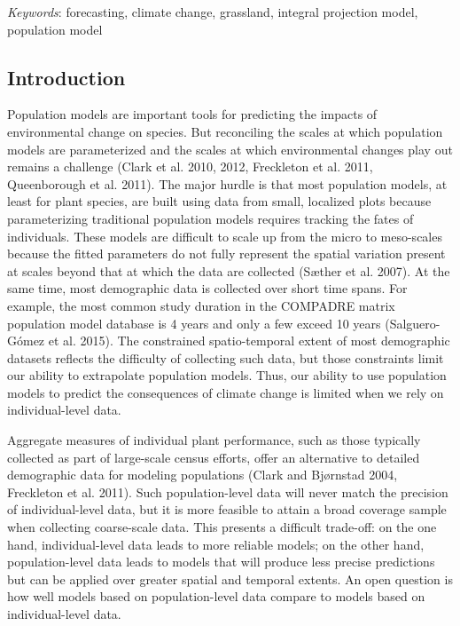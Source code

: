 \documentclass[12pt,]{article}
\begin{document}
\emph{Keywords}: forecasting, climate change, grassland, integral
projection model, population model

\subsection{Introduction}\label{introduction}

Population models are important tools for predicting the impacts of
environmental change on species. But reconciling the scales at which
population models are parameterized and the scales at which
environmental changes play out remains a challenge (Clark et al. 2010,
2012, Freckleton et al. 2011, Queenborough et al. 2011). The major
hurdle is that most population models, at least for plant species, are
built using data from small, localized plots because parameterizing
traditional population models requires tracking the fates of
individuals. These models are difficult to scale up from the micro to
meso-scales because the fitted parameters do not fully represent the
spatial variation present at scales beyond that at which the data are
collected (Sæther et al. 2007). At the same time, most demographic data
is collected over short time spans. For example, the most common study
duration in the COMPADRE matrix population model database is 4 years and
only a few exceed 10 years (Salguero-Gómez et al. 2015). The constrained
spatio-temporal extent of most demographic datasets reflects the
difficulty of collecting such data, but those constraints limit our
ability to extrapolate population models. Thus, our ability to use
population models to predict the consequences of climate change is
limited when we rely on individual-level data.

Aggregate measures of individual plant performance, such as those
typically collected as part of large-scale census efforts, offer an
alternative to detailed demographic data for modeling populations (Clark
and Bjørnstad 2004, Freckleton et al. 2011). Such population-level data
will never match the precision of individual-level data, but it is more
feasible to attain a broad coverage sample when collecting coarse-scale
data. This presents a difficult trade-off: on the one hand,
individual-level data leads to more reliable models; on the other hand,
population-level data leads to models that will produce less precise
predictions but can be applied over greater spatial and temporal
extents. An open question is how well models based on population-level
data compare to models based on individual-level data.
\end{document}
